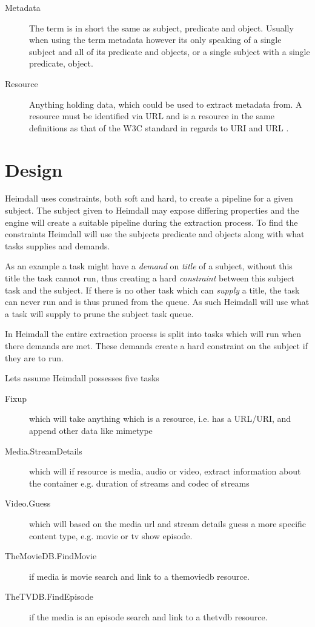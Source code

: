 \documentclass[10pt,a4paper]{article}
\begin{document}
\begin{description}
	\item[Metadata] The term is in short the same as subject, predicate and object. Usually when using the term metadata however its only speaking of a single subject and all of its predicate and objects, or a single subject with a single predicate, object.
	\item[Resource] Anything holding data, which could be used to extract metadata from. A resource must be identified via URL and is a resource in the same definitions as that of the W3C standard in regards to URI and URL \cite{w3c-url} \cite{w3c-uri}.
\end{description}

\section{Design}
Heimdall uses constraints, both soft and hard, to create a pipeline for a given subject. The subject given to Heimdall may expose differing properties and the engine will create a suitable pipeline during the extraction process. To find the constraints Heimdall will use the subjects predicate and objects along with what tasks supplies and demands.

As an example a task might have a \emph{demand} on \emph{title} of a subject, without this title the task cannot run, thus creating a hard \emph{constraint} between this subject task and the subject. If there is no other task which can \emph{supply} a title, the task can never run and is thus pruned from the queue. As such Heimdall will use what a task will supply to prune the subject task queue.

In Heimdall the entire extraction process is split into tasks which will run when there demands are met. These demands create a hard constraint on the subject if they are to run.

Lets assume Heimdall possesses five tasks
\begin{description}
	\item[Fixup] which will take anything which is a resource, i.e. has a URL/URI, and append other data like mimetype
	\item[Media.StreamDetails] which will if resource is media, audio or video, extract information about the container e.g. duration of streams and codec of streams
	\item[Video.Guess] which will based on the media url and stream details guess a more specific content type, e.g. movie or tv show episode.
	\item[TheMovieDB.FindMovie] if media is movie search and link to a themoviedb resource.
	\item[TheTVDB.FindEpisode] if the media is an episode search and link to a thetvdb resource.
\end{description}
\end{document}
